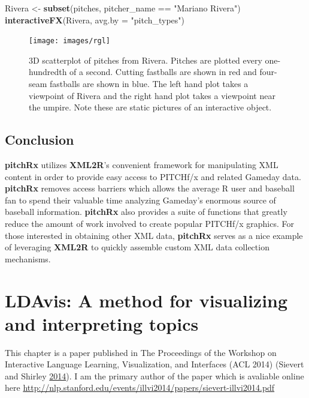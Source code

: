 \documentclass[12pt,]{isuthesis}
\newenvironment{Shaded}{\begin{snugshade}}{\end{snugshade}}
\newcommand{\KeywordTok}[1]{\textcolor[rgb]{0.13,0.29,0.53}{\textbf{{#1}}}}
\newcommand{\DataTypeTok}[1]{\textcolor[rgb]{0.13,0.29,0.53}{{#1}}}
\newcommand{\StringTok}[1]{\textcolor[rgb]{0.31,0.60,0.02}{{#1}}}
\newcommand{\NormalTok}[1]{{#1}}
\begin{document}
\begin{Shaded}
\begin{Highlighting}[]
\NormalTok{Rivera <-}\StringTok{ }\KeywordTok{subset}\NormalTok{(pitches, pitcher_name ==}\StringTok{ "Mariano Rivera"}\NormalTok{)}
\KeywordTok{interactiveFX}\NormalTok{(Rivera, }\DataTypeTok{avg.by =} \StringTok{"pitch_types"}\NormalTok{)}
\end{Highlighting}
\end{Shaded}

\begin{figure}
\centering
\texttt{[image: images/rgl]}
\caption{\label{fig:rgl}3D scatterplot of pitches from Rivera. Pitches are
plotted every one-hundredth of a second. Cutting fastballs are shown in
red and four-seam fastballs are shown in blue. The left hand plot takes
a viewpoint of Rivera and the right hand plot takes a viewpoint near the
umpire. Note these are static pictures of an interactive object.}
\end{figure}

\section{Conclusion}\label{conclusion}

\textbf{pitchRx} utilizes \textbf{XML2R}'s convenient framework for
manipulating XML content in order to provide easy access to PITCHf/x and
related Gameday data. \textbf{pitchRx} removes access barriers which
allows the average R user and baseball fan to spend their valuable time
analyzing Gameday's enormous source of baseball information.
\textbf{pitchRx} also provides a suite of functions that greatly reduce
the amount of work involved to create popular PITCHf/x graphics. For
those interested in obtaining other XML data, \textbf{pitchRx} serves as
a nice example of leveraging \textbf{XML2R} to quickly assemble custom
XML data collection mechanisms.

\chapter{LDAvis: A method for visualizing and interpreting topics}

This chapter is a paper published in The Proceedings of the Workshop on
Interactive Language Learning, Visualization, and Interfaces (ACL 2014)
(Sievert and Shirley \protect\hyperlink{ref-Sievert:2014b}{2014}). I am
the primary author of the paper which is avaliable online here
\url{http://nlp.stanford.edu/events/illvi2014/papers/sievert-illvi2014.pdf}
\end{document}
